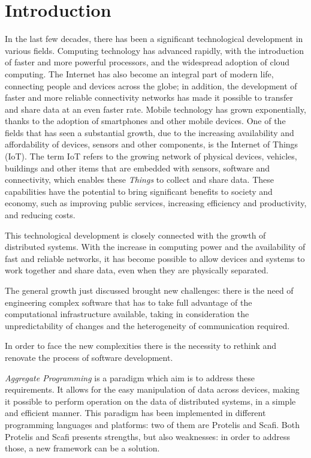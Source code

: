 \chapter{Introduction}\label{introduction}
In the last few decades, there has been a significant technological development in various fields.
Computing technology has advanced rapidly, with the introduction of faster and more powerful processors, and the widespread adoption of cloud computing.\newline
The Internet has also become an integral part of modern life, connecting people and devices across the globe; in addition, the development of faster and more reliable connectivity networks has made it possible to transfer and share data at an even faster rate.\newline
Mobile technology has grown exponentially, thanks to the adoption of smartphones and other mobile devices.\newline
One of the fields that has seen a substantial growth, due to the increasing availability and affordability of devices, sensors and other components, is the Internet of Things (IoT). The term IoT refers to the growing network of physical devices, vehicles, buildings and other items that are embedded with sensors, software and connectivity, which enables these \textit{Things} to collect and share data. These capabilities have the potential to bring significant benefits to society and economy, such as improving public services, increasing efficiency and productivity, and reducing costs.

This technological development is closely connected with the growth of distributed systems. With the increase in computing power and the availability of fast and reliable networks, it has become possible to allow devices and systems to work together and share data, even when they are physically separated.

The general growth just discussed brought new challenges: there is the need of engineering complex software that has to take full advantage of the computational infrastructure available, taking in consideration the unpredictability of changes and the heterogeneity of communication required.

In order to face the new complexities there is the necessity to rethink and renovate the process of software development.

\textit{Aggregate Programming} is a paradigm which aim is to address these requirements. It allows for the easy manipulation of data across devices, making it possible to perform operation on the data of distributed systems, in a simple and efficient manner.\newline
This paradigm has been implemented in different programming languages and platforms: two of them are Protelis and Scafi. 
Both Protelis and Scafi presents strengths, but also weaknesses: in order to address those, a new framework can be a solution.

